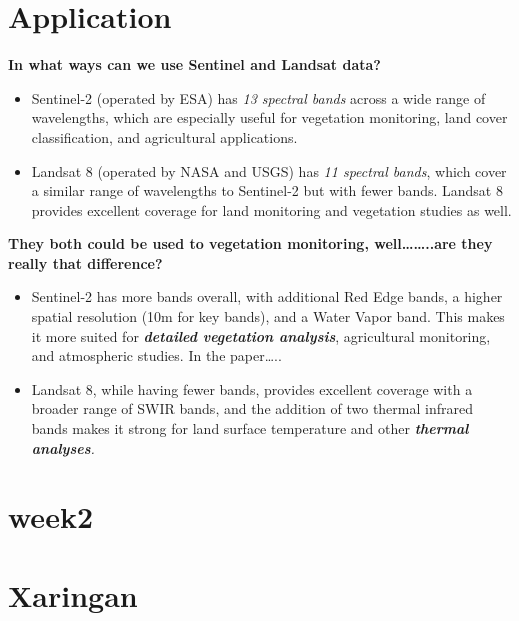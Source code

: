\documentclass[
  letterpaper,
  DIV=11,
  numbers=noendperiod]{scrreprt}
\begin{document}

\hypertarget{application}{%
\chapter{Application}\label{application}}

\textbf{In what ways can we use Sentinel and Landsat data?}

\begin{itemize}
\item
  Sentinel-2 (operated by ESA) has \emph{13 spectral bands} across a
  wide range of wavelengths, which are especially useful for vegetation
  monitoring, land cover classification, and agricultural applications.
\item
  Landsat 8 (operated by NASA and USGS) has \emph{11 spectral bands},
  which cover a similar range of wavelengths to Sentinel-2 but with
  fewer bands. Landsat 8 provides excellent coverage for land monitoring
  and vegetation studies as well.
\end{itemize}

\textbf{They both could be used to vegetation monitoring,
well\ldots\ldots..are they really that difference?}

\begin{itemize}
\item
  Sentinel-2 has more bands overall, with additional Red Edge bands, a
  higher spatial resolution (10m for key bands), and a Water Vapor band.
  This makes it more suited for \textbf{\emph{detailed vegetation
  analysis}}, agricultural monitoring, and atmospheric studies. In the
  paper\ldots..
\item
  Landsat 8, while having fewer bands, provides excellent coverage with
  a broader range of SWIR bands, and the addition of two thermal
  infrared bands makes it strong for land surface temperature and other
  \emph{\textbf{thermal analyses}.}
\end{itemize}


\hypertarget{week2}{%
\chapter{week2}\label{week2}}


\hypertarget{xaringan}{%
\chapter{Xaringan}\label{xaringan}}
\end{document}
